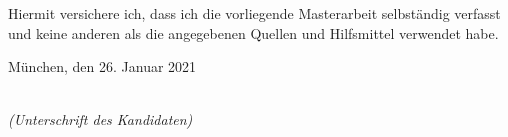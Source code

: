 %
%
%
%

\newpage

\thispagestyle{empty}

\begin{large}

\vspace*{2cm}

\noindent
Hiermit versichere ich, dass ich die vorliegende Masterarbeit
selbständig verfasst und keine anderen als die angegebenen Quellen
und Hilfsmittel verwendet habe.

\vspace{2cm}

\noindent
München, den 26. Januar 2021

\vspace{3cm}

\hspace*{7cm}%
\dotfill\\
\hspace*{8.5cm}%
\textit{(Unterschrift des Kandidaten)}

\end{large}

